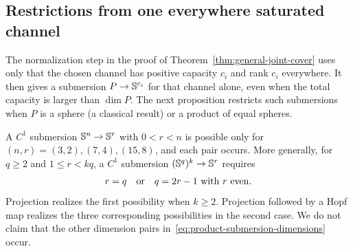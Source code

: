 \subsection{Restrictions from one everywhere saturated channel}
The normalization step in the proof of
Theorem~\ref{thm:general-joint-cover} uses only that the chosen channel
has positive capacity $c_i$ and rank $c_i$ everywhere. It then gives a
submersion $P\to\mathbb S^{c_i}$ for that channel alone,
even when the total capacity is larger than $\dim P$. The next
proposition restricts such submersions when $P$ is a sphere (a classical
result) or a product of equal spheres.

\begin{proposition}
\label{prop:sphere-product-submersions}
A $C^1$ submersion $\mathbb S^n\to\mathbb S^r$ with $0<r<n$ is possible only
for $(n,r)=(3,2),(7,4),(15,8)$, and each pair occurs.
More generally, for $q\geq2$ and $1\leq r<kq$, a $C^1$ submersion
$(\mathbb S^q)^k\to\mathbb S^r$ requires
\begin{equation}\label{eq:product-submersion-dimensions}
 r=q\quad\hbox{or}\quad q=2r-1\ \hbox{with $r$ even}.
\end{equation}
Projection realizes the first possibility when $k\geq2$. Projection
followed by a Hopf map realizes the three corresponding possibilities
in the second case. We do not claim that the other dimension pairs
in~\eqref{eq:product-submersion-dimensions} occur.
\end{proposition}
